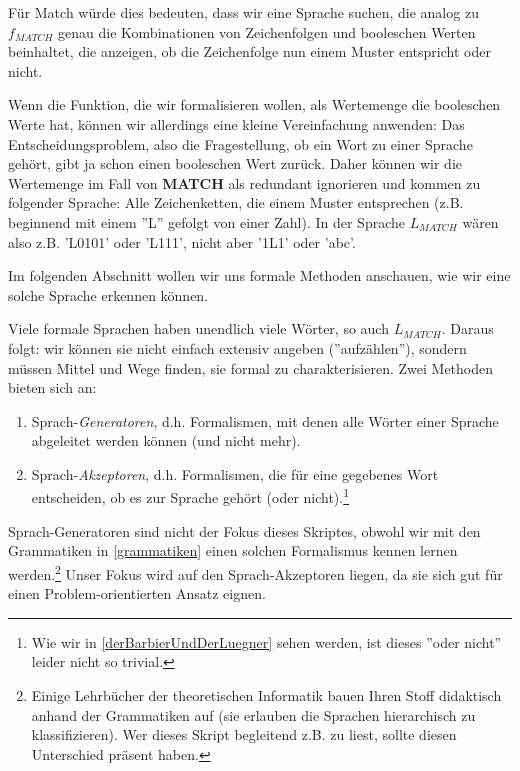 Für Match würde dies bedeuten, dass wir eine Sprache suchen,
die analog zu $f_{MATCH}$ genau die Kombinationen von Zeichenfolgen und booleschen Werten beinhaltet,
die anzeigen, ob die Zeichenfolge nun einem Muster entspricht oder nicht.

Wenn die Funktion, die wir formalisieren wollen, als Wertemenge die booleschen Werte hat,
können wir allerdings eine kleine Vereinfachung anwenden:
Das Entscheidungsproblem, also die Fragestellung, ob ein Wort zu einer Sprache gehört,
gibt ja schon einen booleschen Wert zurück.
Daher können wir die Wertemenge im Fall von \textbf{MATCH} als redundant ignorieren
und kommen zu folgender Sprache:
Alle Zeichenketten, die einem Muster entsprechen
(z.B. beginnend mit einem ''L'' gefolgt von einer Zahl).
In der Sprache $L_{MATCH}$ wären also z.B. 'L0101' oder 'L111',
nicht aber '1L1' oder 'abc'.

Im folgenden Abschnitt wollen wir uns formale Methoden anschauen,
wie wir eine solche Sprache erkennen können.


Viele formale Sprachen haben unendlich viele Wörter,
so auch $L_{MATCH}$.
Daraus folgt: wir können sie nicht einfach extensiv angeben (''aufzählen''),
sondern müssen Mittel und Wege finden, sie formal zu charakterisieren.
Zwei Methoden bieten sich an:
\begin{enumerate}
    \item Sprach-\emph{Generatoren}, d.h. Formalismen,
        mit denen alle Wörter einer Sprache abgeleitet werden können
        (und nicht mehr).
    \item Sprach-\emph{Akzeptoren}, d.h. Formalismen,
        die für eine gegebenes Wort entscheiden,
        ob es zur Sprache gehört (oder nicht).\footnote{
            Wie wir in \autoref{derBarbierUndDerLuegner} sehen werden,
            ist dieses ''oder nicht'' leider nicht so trivial.}
\end{enumerate}

Sprach-Generatoren sind nicht der Fokus dieses Skriptes, obwohl wir mit den Grammatiken
in \autoref{grammatiken} einen solchen Formalismus kennen lernen werden.\footnote{
Einige Lehrbücher der theoretischen Informatik bauen Ihren Stoff didaktisch anhand der Grammatiken
auf (sie erlauben die Sprachen hierarchisch zu klassifizieren).
Wer dieses Skript begleitend z.B. zu \cite{schoening} liest,
sollte diesen Unterschied präsent haben.}
Unser Fokus wird auf den Sprach-Akzeptoren liegen,
da sie sich gut für einen Problem-orientierten Ansatz eignen.

